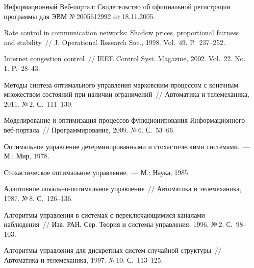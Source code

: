 \begin{multicols}{2}
{{\begin{thebibliography}{99}
Информационный Веб-портал: Свидетельство об официальной регистрации программы для 
ЭВМ №\,2005612992 от 18.11.2005.

Rate control in communication networks: Shadow prices, proportional fairness and stability~// J. 
Operational Research Soc., 1998. Vol.~49. P.~237--252.

Internet congestion control~// IEEE Control Syst. Magazine, 2002. Vol.~22. No.\,1. P.~28--43.

Методы синтеза оптимального управления марковским процессом с конечным множеством 
состояний при наличии ограничений~// Автоматика и телемеханика, 2011. №\,2. С.~111--130.

Моделирование и оптимизация процессов функционирования Информационного 
веб-пор\-та\-ла~// Программирование, 2009. №\,6. С.~53--66.


 Оптимальное управление детерминированными и 
стохастическими системами.~--- М.: Мир, 1978.

Стохастическое оптимальное управление.~--- М.: Наука, 1985.


Адаптивное локально-оп\-ти\-маль\-ное управление~// Автоматика и телемеханика, 1987. №\,8. 
С.~126--136.

Алгоритмы управления в системах с переключающимися каналами наблюдения~// Изв. РАН. 
Сер. Теория и системы управления, 1996. №\,2. С.~98--103.

\label{end\stat}

Алгоритмы управления для дискретных систем случайной структуры~// Автоматика и 
телемеханика, 1997. №\,10. С.~113--125.
 \end{thebibliography}
}
}


\end{multicols}       

  


  